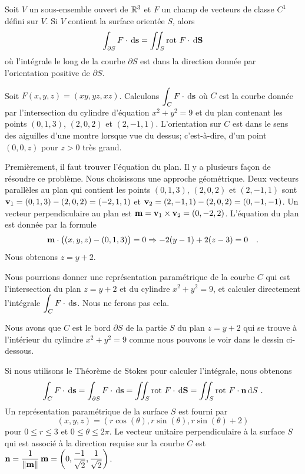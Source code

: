 {\begin{theorem}
Soit $V$ un sous-ensemble ouvert de $\mathbb{R}^3$ et $F$ un champ de
vecteurs de classe $C^1$ défini sur $V$.  Si $V$ contient la surface
orientée $S$, alors
\begin{equation} \label{Stokes_equ}
\int_{\partial S} F\cdot \,\mathrm{d}\mathbf{s}
= \iint_S \operatorname{rot}\,F \cdot \,\mathrm{d}\mathbf{S}
\end{equation}
où l'intégrale le long de la courbe $\partial S$ est dans la direction 
donnée par l'orientation positive de $\partial S$.
\end{theorem}


\begin{egg}
Soit $F(x,y,z) = (xy, yz, xz)$.  Calculons
$\displaystyle \int_C F \cdot \,\mathrm{d}\mathbf{s}$
où $C$ est la courbe donnée par l'intersection du cylindre d'équation
$x^2 + y^2 =9$ et du plan contenant les points $(0,1,3)$, $(2,0,2)$ et
$(2,-1,1)$.  L'orientation sur $C$ est dans le sens des aiguilles
d'une montre lorsque vue du dessus; c'est-à-dire, d'un point $(0,0,z)$
pour $z>0$ très grand.

Premièrement, il faut trouver l'équation du plan.  Il y a plusieurs
façon de résoudre ce problème.  Nous choisissons une approche géométrique.
Deux vecteurs parallèles au plan qui contient les points
$(0,1,3)$, $(2,0,2)$ et $(2,-1,1)$ sont
$\mathbf{v}_1 = (0,1,3) - (2,0,2) = (-2,1,1)$ et
$\mathbf{v}_2 = (2,-1,1) - (2,0,2) = (0,-1,-1)$.  Un vecteur
perpendiculaire au plan est
$\mathbf{m} = \mathbf{v}_1 \times \mathbf{v}_2 = (0,-2,2)$.  L'équation du plan
est donnée par la formule
\[
  \mathbf{m} \cdot \big( (x,y,z) - (0,1,3) \big) = 0 \Rightarrow
  -2 (y-1) +2 (z-3) = 0 \quad .
\]
Nous obtenons $z = y + 2$.

Nous pourrions donner une représentation paramétrique de la courbe $C$
qui est l'intersection du plan $z = y+2$ et du cylindre
$x^2 + y^2 = 9$, et calculer directement l'intégrale
$\displaystyle \int_C F \cdot \,\mathrm{d}\mathbf{s}$.  Nous ne ferons pas cela.

Nous avons que $C$ est le bord $\partial S$ de la partie $S$ du plan $z = y+2$
qui se trouve à l'intérieur du cylindre $x^2 + y^2 = 9$ comme nous pouvons
le voir dans le dessin ci-dessous.

Si nous utilisons le Théorème de Stokes pour calculer l'intégrale,
nous obtenons
\[
\int_C F \cdot \,\mathrm{d}\mathbf{s} = \int_{\partial S} F\cdot \,\mathrm{d}\mathbf{s}
= \iint_S \operatorname{rot}\,F \cdot \,\mathrm{d}\mathbf{S}
= \iint_S \operatorname{rot}\,F \cdot \mathbf{n} \,\mathrm{d}S \ .
\]
Un représentation paramétrique de la surface $S$ est fourni par
\[
  (x,y,z) = (r \cos(\theta), r\sin(\theta), r\sin(\theta) + 2)
\]
pour $0\leq r \leq 3$ et $0 \leq \theta \leq 2\pi$.  Le vecteur
unitaire perpendiculaire à la surface $S$ qui est associé à la
direction requise sur la courbe $C$ est
$\displaystyle \mathbf{n} = \frac{1}{\|\mathbf{m}\|}\,\mathbf{m} =
\left( 0, \frac{-1}{\sqrt{2}}, \frac{1}{\sqrt{2}} \right)$.


\end{egg}}
